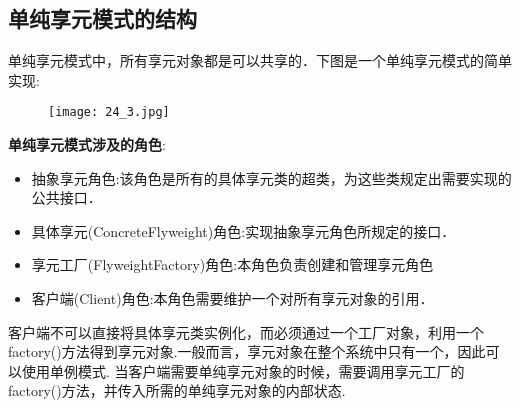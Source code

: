 \documentclass[../main.tex]{subfiles}
\begin{document}
\subsection{单纯享元模式的结构}
\noindent 单纯享元模式中，所有享元对象都是可以共享的．下图是一个单纯享元模式的简单实现:
%
\begin{figure}[H]
  \texttt{[image: 24\_3.jpg]}
\end{figure}
%
\textbf{单纯享元模式涉及的角色}:
\begin{itemize}
  \item 抽象享元角色:该角色是所有的具体享元类的超类，为这些类规定出需要实现的公共接口．
  \item 具体享元(ConcreteFlyweight)角色:实现抽象享元角色所规定的接口．
  \item 享元工厂(FlyweightFactory)角色:本角色负责创建和管理享元角色
  \item 客户端(Client)角色:本角色需要维护一个对所有享元对象的引用．
\end{itemize}
%


%
客户端不可以直接将具体享元类实例化，而必须通过一个工厂对象，利用一个factory()方法得到享元对象.一般而言，享元对象在整个系统中只有一个，因此可以使用单例模式.
当客户端需要单纯享元对象的时候，需要调用享元工厂的factory()方法，并传入所需的单纯享元对象的内部状态.
%

%
\end{document}
